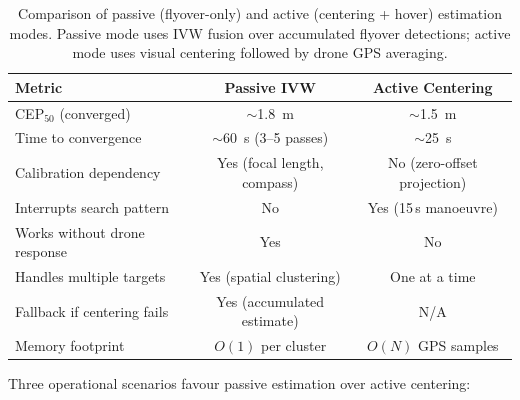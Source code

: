 \begin{table}[H]
  \centering
  \caption{Comparison of passive (flyover-only) and active (centering + hover) estimation modes.  Passive mode uses IVW fusion over accumulated flyover detections; active mode uses visual centering followed by drone GPS averaging.}
  \label{tab:passive-vs-active}
  \small
  \begin{tabular}{@{}lcc@{}}
    \toprule
    \textbf{Metric} & \textbf{Passive IVW} & \textbf{Active Centering} \\
    \midrule
    CEP$_{50}$ (converged)             & $\sim$\SI{1.8}{\metre} & $\sim$\SI{1.5}{\metre} \\
    Time to convergence                 & $\sim$\SI{60}{\second} (3--5 passes) & $\sim$\SI{25}{\second} \\
    Calibration dependency              & Yes (focal length, compass) & No (zero-offset projection) \\
    Interrupts search pattern           & No & Yes (15\,s manoeuvre) \\
    Works without drone response        & Yes & No \\
    Handles multiple targets            & Yes (spatial clustering) & One at a time \\
    Fallback if centering fails         & Yes (accumulated estimate) & N/A \\
    Memory footprint                    & $O(1)$ per cluster & $O(N)$ GPS samples \\
    \bottomrule
  \end{tabular}
\end{table}

\noindent Three operational scenarios favour passive estimation over active centering:

